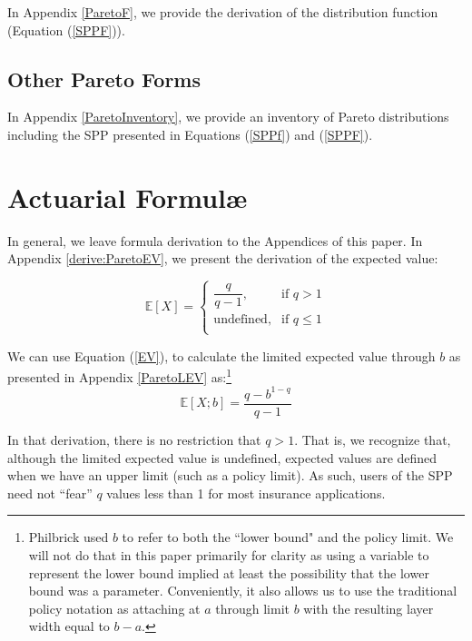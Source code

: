 \documentclass[]{article} %
\begin{document}
In  Appendix \ref{ParetoF}, we provide the derivation of the distribution function (Equation (\ref{SPPF})).

\subsection{Other Pareto Forms}
In Appendix \ref{ParetoInventory}, we provide an inventory of Pareto distributions including the SPP presented in Equations (\ref{SPPf}) and (\ref{SPPF}). 

\section{Actuarial Formul\ae}
In general, we leave formula derivation to the Appendices of this paper. In Appendix \ref{derive:ParetoEV}, we present the derivation of the expected value:

\begin{equation}
\mathbb{E}[X]  = 
\begin{cases}
\dfrac{q}{q-1},& \text{if } q > 1\\
\text{undefined},& \text{if } q \leq 1\\         
\end{cases}
\end{equation}


We can use Equation (\ref{EV}), to calculate the limited expected value through $b$
as presented in Appendix \ref{ParetoLEV} as:\footnote{Philbrick used $b$ to refer to both the ``lower bound" and the policy limit. We will not do that in this paper primarily for clarity as using a variable to represent the lower bound implied at least the possibility that the lower bound was a parameter. Conveniently, it also allows us  to use the traditional policy notation as attaching at $a$ through limit $b$ with the resulting layer width equal to $b - a$.} 
\begin{equation}
	\mathbb{E}[X;b] = \frac{q - b^{1-q}}{q-1}
\end{equation}

In that derivation, there is no restriction that $q > 1$. That is, we recognize that, although the limited expected value is undefined, expected values are defined when we have an upper limit (such as a policy limit). As such, users of the SPP need not ``fear'' $q$ values less than 1 for most insurance applications.
\end{document}
